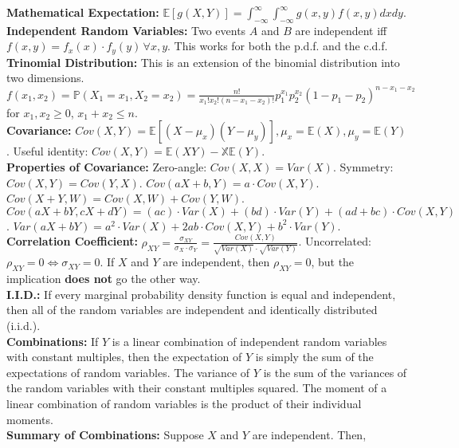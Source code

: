 \documentclass[10pt, twocolumn]{article}
\begin{document}
\textbf{Mathematical Expectation:} $\mathbb{E}[g(X,Y)] = \int_{-\infty}^{\infty} \int_{-\infty}^{\infty} g(x,y) f(x,y) dx dy$.\\
\textbf{Independent Random Variables:} Two events $A$ and $B$ are independent iff $f(x,y) = f_x(x) \cdot f_y(y) \, \forall x,y$. This works for both the p.d.f. and the c.d.f.\\
\textbf{Trinomial Distribution:} This is an extension of the binomial distribution into two dimensions. $f(x_1,x_2) = \mathbb{P}(X_1 = x_1, X_2 = x_2) = \frac{n!}{x_1! x_2! (n - x_1 - x_2)!} p_1^{x_1} p_2^{x_2} (1 - p_1 - p_2)^{n - x_1 - x_2}$ for $x_1, x_2 \geq 0$, $x_1 + x_2 \leq n$.\\
\textbf{Covariance:} $Cov(X,Y) = \mathbb{E}[(X - \mu_x)(Y - \mu_y)], \mu_x = \mathbb{E}(X), \mu_y = \mathbb{E}(Y)$. Useful identity: $Cov(X,Y) = \mathbb{E}(XY) - \mathbb{X}\mathbb{E}(Y)$.\\
\textbf{Properties of Covariance:} Zero-angle: $Cov(X,X) = Var(X)$. Symmetry: $Cov(X,Y) = Cov(Y,X)$. $Cov(aX + b, Y) = a \cdot Cov(X,Y)$. $Cov(X+Y, W) = Cov(X,W) + Cov(Y,W)$. $Cov(aX+bY, cX+dY) = (ac) \cdot Var(X)+(bd) \cdot Var(Y)+(ad+bc) \cdot Cov(X, Y)$. $Var(aX + bY) = a^2 \cdot Var(X) + 2ab \cdot Cov(X, Y) + b^2 \cdot Var(Y)$.\\
\textbf{Correlation Coefficient:} $\rho_{XY} = \frac{\sigma_{XY}}{\sigma_X \cdot \sigma_Y} = \frac{Cov(X,Y)}{\sqrt{Var(X)} \cdot \sqrt{Var(Y)}}$. Uncorrelated: $\rho_{XY} = 0 \Leftrightarrow \sigma_{XY} = 0$. If $X$ and $Y$ are independent, then $\rho_{XY} = 0$, but the implication \textbf{does not} go the other way.\\
\textbf{I.I.D.:} If every marginal probability density function is equal and independent, then all of the random variables are independent and identically distributed (i.i.d.).\\
\textbf{Combinations:} If $Y$ is a linear combination of independent random variables with constant multiples, then the expectation of $Y$ is simply the sum of the expectations of random variables. The variance of $Y$ is the sum of the variances of the random variables with their constant multiples squared. The moment of a linear combination of random variables is the product of their individual moments.\\
\textbf{Summary of Combinations:} Suppose $X$ and $Y$ are independent. Then,
\end{document}
